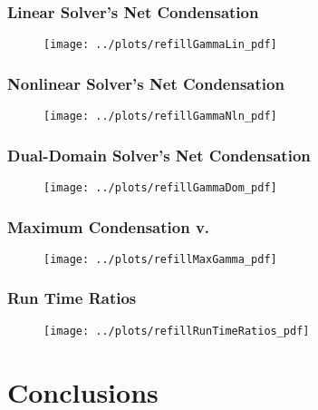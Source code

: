 \documentclass[compress,xcolor=table]{beamer}
\begin{document}
\begin{frame}
\frametitle{Linear Solver's Net Condensation}

\begin{figure}[h!t]
\centering
\texttt{[image: ../plots/refillGammaLin\_pdf]}
\end{figure}

\end{frame}
\begin{frame}
\frametitle{Nonlinear Solver's Net Condensation}

\begin{figure}[h!t]
\centering
\texttt{[image: ../plots/refillGammaNln\_pdf]}
\end{figure}

\end{frame}
\begin{frame}
\frametitle{Dual-Domain Solver's Net Condensation}

\begin{figure}[h!t]
\centering
\texttt{[image: ../plots/refillGammaDom\_pdf]}
\end{figure}

\end{frame}
\begin{frame}
\frametitle{Maximum Condensation v. \dtmax{}}

\begin{figure}[h!t]
\centering
\texttt{[image: ../plots/refillMaxGamma\_pdf]}
\end{figure}

\end{frame}
\begin{frame}
\frametitle{Run Time Ratios}

\begin{figure}[h!t]
\centering
\texttt{[image: ../plots/refillRunTimeRatios\_pdf]}
\end{figure}

\end{frame}
\section[Conclusions]{Conclusions}
\end{document}

